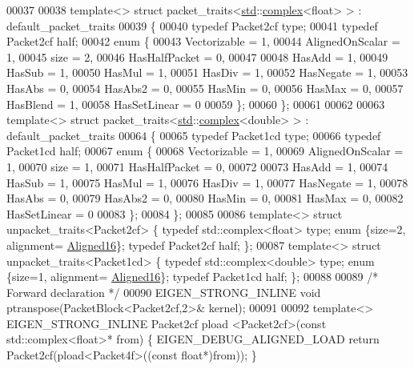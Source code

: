 \begin{DoxyCode}
00037 
00038 \textcolor{keyword}{template}<> \textcolor{keyword}{struct }packet\_traits<\hyperlink{namespacestd}{std}::\hyperlink{structcomplex}{complex}<float> >  : default\_packet\_traits
00039 \{
00040   \textcolor{keyword}{typedef} Packet2cf type;
00041   \textcolor{keyword}{typedef} Packet2cf half;
00042   \textcolor{keyword}{enum} \{
00043     Vectorizable = 1,
00044     AlignedOnScalar = 1,
00045     size = 2,
00046     HasHalfPacket = 0,
00047 
00048     HasAdd    = 1,
00049     HasSub    = 1,
00050     HasMul    = 1,
00051     HasDiv    = 1,
00052     HasNegate = 1,
00053     HasAbs    = 0,
00054     HasAbs2   = 0,
00055     HasMin    = 0,
00056     HasMax    = 0,
00057     HasBlend  = 1,
00058     HasSetLinear = 0
00059   \};
00060 \};
00061 
00062 
00063 \textcolor{keyword}{template}<> \textcolor{keyword}{struct }packet\_traits<\hyperlink{namespacestd}{std}::\hyperlink{structcomplex}{complex}<double> >  : default\_packet\_traits
00064 \{
00065   \textcolor{keyword}{typedef} Packet1cd type;
00066   \textcolor{keyword}{typedef} Packet1cd half;
00067   \textcolor{keyword}{enum} \{
00068     Vectorizable = 1,
00069     AlignedOnScalar = 1,
00070     size = 1,
00071     HasHalfPacket = 0,
00072 
00073     HasAdd    = 1,
00074     HasSub    = 1,
00075     HasMul    = 1,
00076     HasDiv    = 1,
00077     HasNegate = 1,
00078     HasAbs    = 0,
00079     HasAbs2   = 0,
00080     HasMin    = 0,
00081     HasMax    = 0,
00082     HasSetLinear = 0
00083   \};
00084 \};
00085 
00086 \textcolor{keyword}{template}<> \textcolor{keyword}{struct }unpacket\_traits<Packet2cf> \{ \textcolor{keyword}{typedef} std::complex<float>  type; \textcolor{keyword}{enum} \{size=2, alignment=
      \hyperlink{group__enums_gga45fe06e29902b7a2773de05ba27b47a1af8e2bf74b04c02199f62c5e3c06dbfcc}{Aligned16}\}; \textcolor{keyword}{typedef} Packet2cf half; \};
00087 \textcolor{keyword}{template}<> \textcolor{keyword}{struct }unpacket\_traits<Packet1cd> \{ \textcolor{keyword}{typedef} std::complex<double> type; \textcolor{keyword}{enum} \{size=1, alignment=
      \hyperlink{group__enums_gga45fe06e29902b7a2773de05ba27b47a1af8e2bf74b04c02199f62c5e3c06dbfcc}{Aligned16}\}; \textcolor{keyword}{typedef} Packet1cd half; \};
00088 
00089 \textcolor{comment}{/* Forward declaration */}
00090 EIGEN\_STRONG\_INLINE \textcolor{keywordtype}{void} ptranspose(PacketBlock<Packet2cf,2>& kernel);
00091 
00092 \textcolor{keyword}{template}<> EIGEN\_STRONG\_INLINE Packet2cf pload <Packet2cf>(\textcolor{keyword}{const} std::complex<float>* from)  \{ 
      EIGEN\_DEBUG\_ALIGNED\_LOAD \textcolor{keywordflow}{return} Packet2cf(pload<Packet4f>((\textcolor{keyword}{const} \textcolor{keywordtype}{float}*)from)); \}

\end{DoxyCode}
